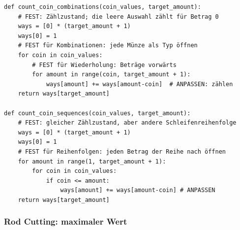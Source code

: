 \begin{contentbox}
\begin{factlist}
\end{factlist}
\end{contentbox}

\begin{codebox}
\begin{lstlisting}[style=CodeExpert]
def count_coin_combinations(coin_values, target_amount):
    # FEST: Zählzustand; die leere Auswahl zählt für Betrag 0
    ways = [0] * (target_amount + 1)
    ways[0] = 1
    # FEST für Kombinationen: jede Münze als Typ öffnen
    for coin in coin_values:
        # FEST für Wiederholung: Beträge vorwärts
        for amount in range(coin, target_amount + 1):
            ways[amount] += ways[amount-coin]  # ANPASSEN: zählen
    return ways[target_amount]

def count_coin_sequences(coin_values, target_amount):
    # FEST: gleicher Zählzustand, aber andere Schleifenreihenfolge
    ways = [0] * (target_amount + 1)
    ways[0] = 1
    # FEST für Reihenfolgen: jeden Betrag der Reihe nach öffnen
    for amount in range(1, target_amount + 1):
        for coin in coin_values:
            if coin <= amount:
                ways[amount] += ways[amount-coin] # ANPASSEN
    return ways[target_amount]
\end{lstlisting}
\end{codebox}

\subsubsection{Rod Cutting: maximaler Wert}\label{sec:03-rod-cutting}

\begin{contentbox}
\begin{factlist}
\end{factlist}
\end{contentbox}

